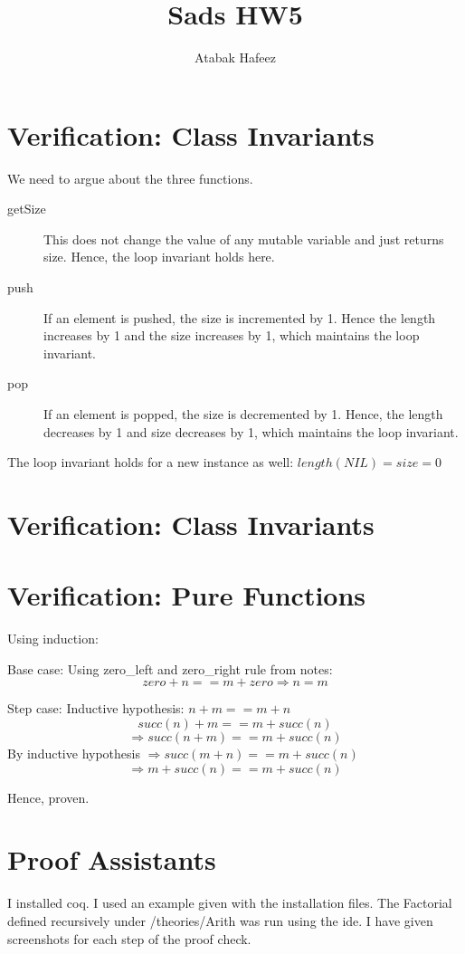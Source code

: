 \documentclass[11pt, oneside]{article}   	%
\title{Sads HW5	}
\author{Atabak Hafeez}
\begin{document}
\maketitle


\section{Verification: Class Invariants}

We need to argue about the three functions. 

\begin{description}
\item[getSize] 
This does not change the value of any mutable variable and just returns size. Hence, the loop invariant holds here.
\item[push]
If an element is pushed, the size is incremented by 1. Hence the length increases by 1 and the size increases by 1, which maintains the loop invariant.
\item[pop] 
If an element is popped, the size is decremented by 1. Hence, the length decreases by 1 and size decreases by 1, which maintains the loop invariant.
\end{description}

The loop invariant holds for a new instance as well: $length(NIL) = size = 0$

\section{Verification: Class Invariants}

\section{Verification: Pure Functions}

Using induction:

Base case: 
Using zero\_left and zero\_right rule from notes: 
$$ zero + n == m + zero \Rightarrow n = m  $$

Step case:
Inductive hypothesis: $ n + m == m + n $
$$ succ(n) + m == m + succ(n) $$
$$ \Rightarrow succ(n + m) == m + succ(n) $$
By inductive hypothesis $ \Rightarrow succ(m + n) == m + succ(n)$
$$ \Rightarrow m + succ(n) == m + succ(n)$$

Hence, proven.

\section{Proof Assistants}

I installed coq. I used an example given with the installation files. The Factorial defined recursively under /theories/Arith was run using the ide. I have given screenshots for each step of the proof check.
\end{document}
